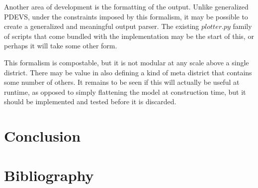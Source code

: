 \documentclass[twocolumn]{article}
\begin{document}
Another area of development is the formatting of the output. Unlike generalized PDEVS, under the constraints imposed by this formalism, it may be possible to create a generalized and meaningful output parser. The existing $plotter.py$ family of scripts that come bundled with the implementation may be the start of this, or perhaps it will take some other form.

This formalism is compostable, but it is not modular at any scale above a single district. There may be value in also defining a kind of meta district that contains some number of others. It remains to be seen if this will actually be useful at runtime, as opposed to simply flattening the model at construction time, but it should be implemented and tested before it is discarded.

\section{Conclusion}



\section{Bibliography}
\end{document}
